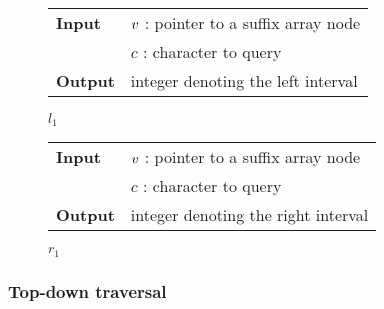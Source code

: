 \begin{figure*}[t!]
\begin{minipage}[t]{.5\textwidth}
\begin{algorithm}[H]
\begin{tabular}{ll}
\textbf{Input}  & $v$ : pointer to a suffix array node\\
				& $c$ : character to query\\
\textbf{Output} & integer denoting the left interval\\
\end{tabular}
\begin{algorithmic}[1]
	\Else
	\EndIf
\EndWhile
\State \Return $l_1$
\end{algorithmic}
\label{alg:sa-lower}
\end{algorithm}
\end{minipage}
\hfill
\begin{minipage}[t]{.5\textwidth}
\begin{algorithm}[H]
\begin{tabular}{ll}
\textbf{Input}  & $v$ : pointer to a suffix array node\\
				& $c$ : character to query\\
\textbf{Output} & integer denoting the right interval\\
\end{tabular}
\begin{algorithmic}[1]
	\Else
	\EndIf
\EndWhile
\State \Return $r_1$
\end{algorithmic}
\label{alg:sa-upper}
\end{algorithm}
\end{minipage}
\end{figure*}

\subsubsection{Top-down traversal}

